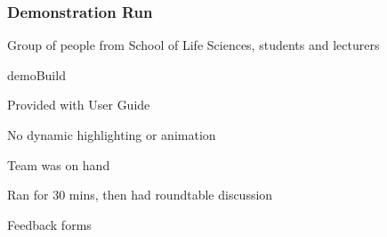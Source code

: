   
\begin{frame}
\frametitle{Demonstration Run}
\item Group of people from School of Life Sciences, students and lecturers
\item demoBuild
\item Provided with User Guide
\item No dynamic highlighting or animation
\item Team was on hand
\item Ran for 30 mins, then had roundtable discussion
\item Feedback forms
\end{frame}    

